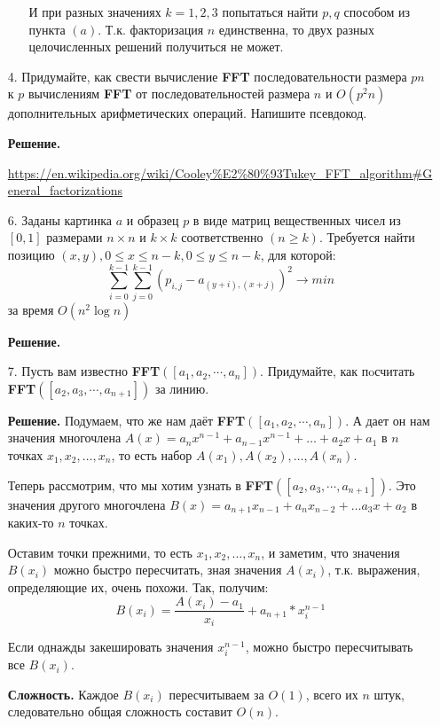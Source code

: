 \begin{enumerate}
\begin{enumerate}
		И при разных значениях $k = 1, 2, 3$ попытаться найти $p,q$ способом из пункта $(a)$. Т.к. факторизация $n$ единственна, то двух разных целочисленных решений получиться не может.
		
	\end{enumerate}
	
	\item[4.] Придумайте, как свести вычисление \textbf{FFT} последовательности размера $pn$ к $p$ вычислениям 
	\textbf{FFT} от	последовательностей размера $n$ и $O(p^2n)$ дополнительных арифметических операций. Напишите 
	псевдокод.
	
	\textbf{Решение.}
	
	\url{https://en.wikipedia.org/wiki/Cooley%E2%80%93Tukey_FFT_algorithm#General_factorizations}
	
	\item[6.] Заданы картинка $a$ и образец $p$ в виде матриц вещественных чисел из $[0, 1]$ размерами $n \times n$ 
	и $k \times k$ соответственно $(n \geqslant k)$. Требуется найти позицию $(x, y), 0 \leqslant x \leqslant n - 
	k, 0 \leqslant y \leqslant n - k$, для которой:
	\begin{equation*}
		\sum\limits_{i = 0}^{k - 1} \sum\limits_{j = 0}^{k - 1} (p_{i,j} - a_{(y + i), (x + j)})^2 \rightarrow min
	\end{equation*}
	за время $O(n^2\log n)$
	
	\textbf{Решение.}
	
	\item[7.] Пусть вам известно \textbf{FFT}$([a_1, a_2, \cdots , a_n])$. Придумайте, как пoсчитать 
	\textbf{FFT}$([a_2, a_3, \cdots , a_{n+1}])$ за линию.
	
	\textbf{Решение.} Подумаем, что же нам даёт \textbf{FFT}$([a_1, a_2, \cdots , a_n])$. А дает он нам значения 
	многочлена $A(x) = a_n x^{n - 1} + a_{n - 1} x^{n - 1} + \dots + a_2 x + a_1$ в $n$ точках $x_1, x_2, \dots, 
	x_n$, то есть набор $A(x_1), A(x_2), \dots, A(x_n)$.
	
	Теперь рассмотрим, что мы хотим узнать в \textbf{FFT}$([a_2, a_3, \cdots , a_{n+1}])$. Это значения другого 
	многочлена $B(x) = a_{n + 1} x_{n - 1} + a_n x_{n - 2} + \dots a_3 x + a_2$ в каких-то $n$ точках. 
	
	Оставим точки прежними, то есть  $x_1, x_2, \dots, x_n$, и заметим, что значения $B(x_i)$ можно быстро 
	пересчитать, зная значения $A(x_i)$, т.к. выражения, определяющие их, очень похожи. Так, получим:
	\begin{equation*}
		B(x_i) = \frac{A(x_i) - a_1}{x_i} + a_{n + 1} * x_i^{n - 1}
	\end{equation*}
	
	Если однажды закешировать значения $x_i^{n - 1}$, можно быстро пересчитывать все $B(x_i)$. 
	
	\textbf{Сложность.} Каждое $B(x_i)$ пересчитываем за $O(1)$, всего их $n$ штук, следовательно общая сложность 
	составит $O(n)$.
	
\end{enumerate}



